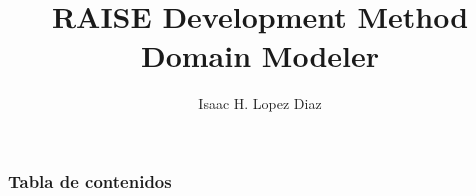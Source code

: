 \documentclass{beamer}
\title{RAISE Development Method Domain Modeler}
\author[] {Isaac H. Lopez Diaz}
\begin{document}
    \begin{frame}
        \titlepage
    \end{frame}

    \begin{frame}
        \frametitle{Tabla de contenidos}
        \tableofcontents
    \end{frame}
\end{document}
